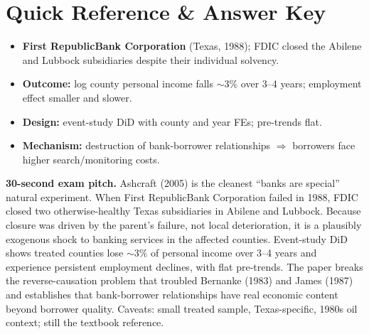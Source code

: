 \documentclass[11pt]{article}
\begin{document}
\section*{Quick Reference \& Answer Key}
\begin{answerbox}
\begin{itemize}
\item \textbf{First RepublicBank Corporation} (Texas, 1988); FDIC closed the Abilene and Lubbock subsidiaries despite their individual solvency.
\item \textbf{Outcome:} log county personal income falls $\sim 3\%$ over 3--4 years; employment effect smaller and slower.
\item \textbf{Design:} event-study DiD with county and year FEs; pre-trends flat.
\item \textbf{Mechanism:} destruction of bank-borrower relationships $\Rightarrow$ borrowers face higher search/monitoring costs.
\end{itemize}
\end{answerbox}

\begin{keybox}
\textbf{30-second exam pitch.} Ashcraft (2005) is the cleanest ``banks are special'' natural experiment. When First RepublicBank Corporation failed in 1988, FDIC closed two otherwise-healthy Texas subsidiaries in Abilene and Lubbock. Because closure was driven by the parent's failure, not local deterioration, it is a plausibly exogenous shock to banking services in the affected counties. Event-study DiD shows treated counties lose $\sim 3\%$ of personal income over 3--4 years and experience persistent employment declines, with flat pre-trends. The paper breaks the reverse-causation problem that troubled Bernanke (1983) and James (1987) and establishes that bank-borrower relationships have real economic content beyond borrower quality. Caveats: small treated sample, Texas-specific, 1980s oil context; still the textbook reference.
\end{keybox}
\end{document}
